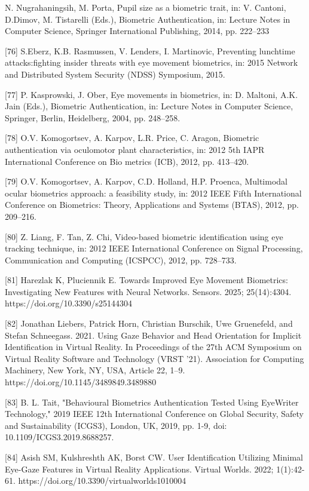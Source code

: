 \documentclass{article}
\begin{document}
\begin{raggedright}
[75] N. Nugrahaningsih, M. Porta, Pupil size as a biometric trait, in: V. Cantoni, D.Dimov, M. Tistarelli (Eds.), Biometric Authentication, in: Lecture Notes in Computer Science, Springer International Publishing, 2014, pp. 222–233

[76] S.Eberz, K.B. Rasmussen, V. Lenders, I. Martinovic, Preventing lunchtime attacks:fighting insider threats with eye movement biometrics, in: 2015 Network and Distributed System Security (NDSS) Symposium, 2015.

[77] P. Kasprowski, J. Ober, Eye movements in biometrics, in: D. Maltoni, A.K. Jain (Eds.), Biometric Authentication, in: Lecture Notes in Computer Science, Springer, Berlin, Heidelberg, 2004, pp. 248–258.

[78] O.V. Komogortsev, A. Karpov, L.R. Price, C. Aragon, Biometric authentication via oculomotor plant characteristics, in: 2012 5th IAPR International Conference on Bio metrics (ICB), 2012, pp. 413–420.

[79] O.V. Komogortsev, A. Karpov, C.D. Holland, H.P. Proenca, Multimodal ocular biometrics approach: a feasibility study, in: 2012 IEEE Fifth International Conference on Biometrics: Theory, Applications and Systems (BTAS), 2012, pp. 209–216.

[80] Z. Liang, F. Tan, Z. Chi, Video-based biometric identification using eye tracking technique, in: 2012 IEEE International Conference on Signal Processing, Communication and Computing (ICSPCC), 2012, pp. 728–733.

[81] Harezlak K, Pluciennik E. Towards Improved Eye Movement Biometrics: Investigating New Features with Neural Networks. Sensors. 2025; 25(14):4304. https://doi.org/10.3390/s25144304

[82] Jonathan Liebers, Patrick Horn, Christian Burschik, Uwe Gruenefeld, and Stefan Schneegass. 2021. Using Gaze Behavior and Head Orientation for Implicit Identification in Virtual Reality. In Proceedings of the 27th ACM Symposium on Virtual Reality Software and Technology (VRST '21). Association for Computing Machinery, New York, NY, USA, Article 22, 1–9. https://doi.org/10.1145/3489849.3489880

[83] B. L. Tait, "Behavioural Biometrics Authentication Tested Using EyeWriter Technology," 2019 IEEE 12th International Conference on Global Security, Safety and Sustainability (ICGS3), London, UK, 2019, pp. 1-9, doi: 10.1109/ICGS3.2019.8688257.

[84] Asish SM, Kulshreshth AK, Borst CW. User Identification Utilizing Minimal Eye-Gaze Features in Virtual Reality Applications. Virtual Worlds. 2022; 1(1):42-61. https://doi.org/10.3390/virtualworlds1010004


\end{raggedright}
\end{document}
